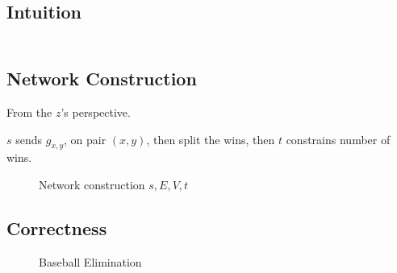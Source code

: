 \documentclass[a4paper]{report}
\theoremstyle{definition}
\begin{document}
\subsection{Intuition}
\begin{align*}

\end{align*}
\subsection{Network Construction}
From the $z$'s perspective.

$s$ sends $g_{x,y}$, on pair $(x,y)$, then split the wins, then $t$ constrains number of wins.

\begin{figure}[!htp]
\centering
{}
\caption{Network construction $s, E, V, t$}
\label{fig:baseball01}
\end{figure}

\subsection{Correctness}
\begin{figure}[!htp]
\centering
{}
\caption{Baseball Elimination}
\label{fig:baseball}
\end{figure}
\end{document}
